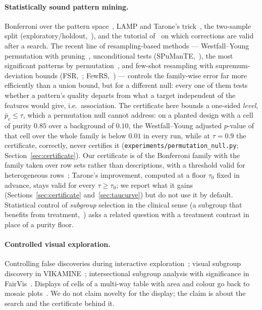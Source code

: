 \documentclass[11pt]{article}
\begin{document}
\paragraph{Statistically sound pattern mining.} Bonferroni over the pattern space~\citep{webb2007}, LAMP and Tarone's trick~\citep{terada2013,llinares2015}, the two-sample split (exploratory/holdout,~\citealp{webb2007}), and the tutorial of~\citet{hamalainen2019} on which corrections are valid after a search. The recent line of resampling-based methods --- Westfall--Young permutation with pruning~\citep{llinares2015}, unconditional tests (SPuManTE,~\citealp{pellegrina2019}), the most significant patterns by permutation~\citep{pellegrina2020}, and few-shot resampling with supremum-deviation bounds (FSR,~\citealp{pellegrina2024}; FewRS,~\citealp{pellegrina2026}) --- controls the family-wise error far more efficiently than a union bound, but for a different null: every one of them tests whether a pattern's quality departs from what a target independent of the features would give, i.e.\ association. The certificate here bounds a one-sided \emph{level}, $\bar p_c\le\tau$, which a permutation null cannot address: on a planted design with a cell of purity $0.85$ over a background of $0.10$, the Westfall--Young adjusted $p$-value of that cell over the whole family is below $0.01$ in every run, while at $\tau=0.9$ the certificate, correctly, never certifies it (\texttt{experiments/permutation\_null.py}; Section~\ref{sec:certificate}). Our certificate is of the Bonferroni family with the family taken over row sets rather than descriptions, with a threshold valid for heterogeneous rows~\citep{hoeffding1956}; Tarone's improvement, computed at a floor $\tau_0$ fixed in advance, stays valid for every $\tau\ge\tau_0$; we report what it gains (Sections~\ref{sec:certificate} and~\ref{sec:taucurve}) but do not use it by default. Statistical control of \emph{subgroup} selection in the clinical sense (a subgroup that benefits from treatment,~\citealp{schnell2023}) asks a related question with a treatment contrast in place of a purity floor.

\paragraph{Controlled visual exploration.} Controlling false discoveries during interactive exploration~\citep{zhao2017,zgraggen2018}; visual subgroup discovery in VIKAMINE~\citep{atzmueller2005}; intersectional subgroup analysis with significance in FairVis~\citep{cabrera2019}. Displays of cells of a multi-way table with area and colour go back to mosaic plots~\citep{friendly1994}. We do not claim novelty for the display; the claim is about the search and the certificate behind it.
\end{document}
